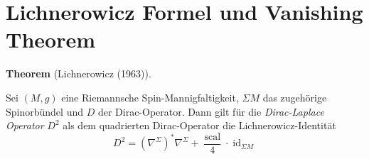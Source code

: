 \documentclass[10pt, letterpaper]{article}
\newcommand{\CustomHeading}[3]{%
  \par\medskip\noindent%
  \textbf{#1 #2} \textnormal{(#3)}.\enskip%
}
\newenvironment{THEO}[2]{\CustomHeading{Theorem}{#1}{#2}}{}
\begin{document}
\pagebreak

\section{Lichnerowicz Formel und Vanishing Theorem}






\begin{THEO}{}{Lichnerowicz (1963)}
Sei $(M,g)$ eine Riemannsche Spin-Mannigfaltigkeit, $\Sigma M$ das zugehörige
Spinorbündel und $D$ der Dirac-Operator. Dann gilt für die \emph{Dirac-Laplace Operator} $D^2$ als dem quadrierten Dirac-Operator die Lichnerowicz-Identität
$$
D^2=\left(\nabla^{\Sigma}\right)^* \nabla^{\Sigma}+\frac{\operatorname{scal}}{4} \cdot \operatorname{id}_{\Sigma M}
$$  
\end{THEO}
\end{document}
